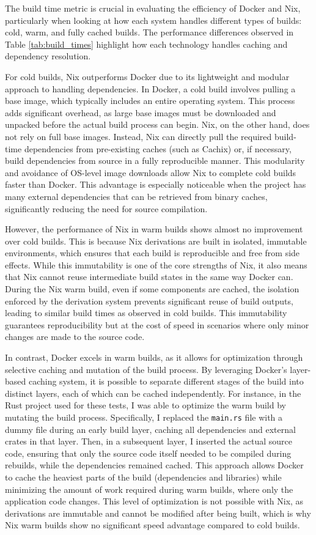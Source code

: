 The build time metric is crucial in evaluating the efficiency of Docker and Nix, particularly
when looking at how each system handles different types of builds: cold, warm, and fully cached
builds. The performance differences observed in Table \ref{tab:build_times} highlight how each
technology handles caching and dependency resolution.

For cold builds, Nix outperforms Docker due to its lightweight and modular approach to handling
dependencies. In Docker, a cold build involves pulling a base image, which typically includes
an entire operating system. This process adds significant overhead, as large base images must
be downloaded and unpacked before the actual build process can begin. Nix, on the other hand,
does not rely on full base images. Instead, Nix can directly pull the required build-time
dependencies from pre-existing caches (such as Cachix) or, if necessary, build dependencies
from source in a fully reproducible manner. This modularity and avoidance of OS-level image
downloads allow Nix to complete cold builds faster than Docker. This advantage is especially
noticeable when the project has many external dependencies that can be retrieved from binary
caches, significantly reducing the need for source compilation.

However, the performance of Nix in warm builds shows almost no improvement over cold builds.
This is because Nix derivations are built in isolated, immutable environments, which ensures
that each build is reproducible and free from side effects. While this immutability is one
of the core strengths of Nix, it also means that Nix cannot reuse intermediate build states
in the same way Docker can. During the Nix warm build, even if some components are cached,
the isolation enforced by the derivation system prevents significant reuse of build outputs,
leading to similar build times as observed in cold builds. This immutability guarantees
reproducibility but at the cost of speed in scenarios where only minor changes are made to
the source code.

In contrast, Docker excels in warm builds, as it allows for optimization through selective
caching and mutation of the build process. By leveraging Docker's layer-based caching system,
it is possible to separate different stages of the build into distinct layers, each of which
can be cached independently. For instance, in the Rust project used for these tests, I was
able to optimize the warm build by mutating the build process. Specifically, I replaced the
\texttt{main.rs} file with a dummy file during an early build layer, caching all dependencies
and external crates in that layer. Then, in a subsequent layer, I inserted the actual source
code, ensuring that only the source code itself needed to be compiled during rebuilds, while
the dependencies remained cached. This approach allows Docker to cache the heaviest parts of
the build (dependencies and libraries) while minimizing the amount of work required during
warm builds, where only the application code changes. This level of optimization is not
possible with Nix, as derivations are immutable and cannot be modified after being built,
which is why Nix warm builds show no significant speed advantage compared to cold builds.

